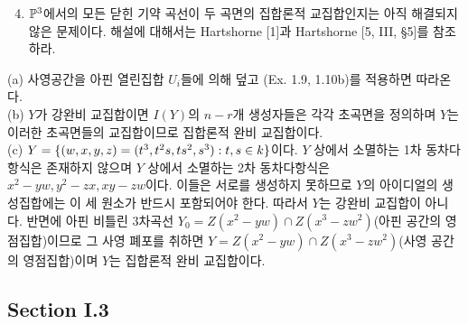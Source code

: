 \begin{enumerate}[label=\tb{2.\arabic*.},itemindent=0mm,itemsep=4mm]
		\begin{enumerate}[label=**(\alph*)]
			\setcounter{enumii}{3}
			\item $\mathbb{P}^3$에서의 모든 닫힌 기약 곡선이 두 곡면의 집합론적 교집합인지는 아직 해결되지 않은 문제이다.
			해설에 대해서는 Hartshorne [1]과 Hartshorne [5, III, \S 5]를 참조하라.
		\end{enumerate}
		\sol (a) 사영공간을 아핀 열린집합 $U_i$들에 의해 덮고 (Ex. 1.9, 1.10b)를 적용하면 따라온다.\\
		(b) $Y$가 강완비 교집합이면 $I(Y)$의 $n-r$개 생성자들은 각각 초곡면을 정의하며
		$Y$는 이러한 초곡면들의 교집합이므로 집합론적 완비 교집합이다.\\
		(c) $Y=\{(w,x,y,z)=(t^3,t^2s,ts^2,s^3):t,s\in k\}$이다.
		$Y$ 상에서 소멸하는 1차 동차다항식은 존재하지 않으며 $Y$ 상에서 소멸하는 2차 동차다항식은 $x^2-yw,y^2-zx,xy-zw$이다.
		이들은 서로를 생성하지 못하므로 $Y$의 아이디얼의 생성집합에는 이 세 원소가 반드시 포함되어야 한다.
		따라서 $Y$는 강완비 교집합이 아니다. 반면에 아핀 비틀린 3차곡선 $Y_0=Z(x^2-yw)\cap Z(x^3-zw^2)$(아핀 공간의 영점집합)이므로
		그 사영 폐포를 취하면 $Y=Z(x^2-yw)\cap Z(x^3-zw^2)$(사영 공간의 영점집합)이며 $Y$는 집합론적 완비 교집합이다.
	\end{enumerate}
	
	
	\subsection*{Section I.3}
	
